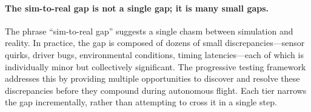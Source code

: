 \paragraph{The sim-to-real gap is not a single gap; it is many small gaps.}
The phrase ``sim-to-real gap'' suggests a single chasm between simulation and reality.  In practice, the gap is composed of dozens of small discrepancies---sensor quirks, driver bugs, environmental conditions, timing latencies---each of which is individually minor but collectively significant.  The progressive testing framework addresses this by providing multiple opportunities to discover and resolve these discrepancies before they compound during autonomous flight.  Each tier narrows the gap incrementally, rather than attempting to cross it in a single step.
